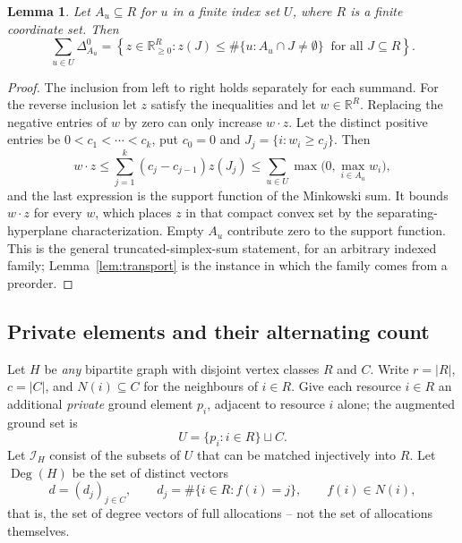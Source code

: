 \documentclass[11pt]{article}
\numberwithin{equation}{section}
\newtheorem{lemma}[theorem]{Lemma}
\theoremstyle{definition}
\theoremstyle{remark}
\newcommand{\R}{\mathbb R}
\newcommand{\Deg}{\operatorname{Deg}}
\newcommand{\Ical}{\mathcal I}
\newcommand{\Dz}[1]{\Delta^{0}_{#1}}
\begin{document}
\begin{lemma}
\label{lem:inequalities}
Let $A_u\subseteq R$ for $u$ in a finite index set $U$, where $R$ is a finite
coordinate set. Then
\begin{equation}
 \sum_{u\in U}\Dz{A_u}
 =\left\{z\in\R_{\ge0}^{R}:
 z(J)\le\#\{u:A_u\cap J\ne\emptyset\}\ \text{ for all }J\subseteq R
 \right\}.
 \label{eq:rank-polytope}
\end{equation}
\end{lemma}

\begin{proof}
The inclusion from left to right holds separately for each summand. For the
reverse inclusion let $z$ satisfy the inequalities and let $w\in\R^R$.
Replacing the negative entries of $w$ by zero can only increase $w\cdot z$.
Let the distinct positive entries be $0<c_1<\cdots<c_k$, put $c_0=0$ and
$J_j=\{i:w_i\ge c_j\}$. Then
\[
 w\cdot z\le\sum_{j=1}^{k}(c_j-c_{j-1})z(J_j)
 \le\sum_{u\in U}\max\bigl(0,\max_{i\in A_u}w_i\bigr),
\]
and the last expression is the support function of the Minkowski sum. It
bounds $w\cdot z$ for every $w$, which places $z$ in that compact convex set
by the separating-hyperplane characterization. Empty $A_u$ contribute zero to
the support function. This is the general truncated-simplex-sum statement, for
an arbitrary indexed family; Lemma~\ref{lem:transport} is the instance in
which the family comes from a preorder.
\end{proof}

\subsection{Private elements and their alternating count}

Let $H$ be \emph{any} bipartite graph with disjoint vertex classes $R$ and
$C$. Write $r=|R|$, $c=|C|$, and $N(i)\subseteq C$ for the neighbours of
$i\in R$. Give each resource $i\in R$ an additional \emph{private} ground
element $p_i$, adjacent to resource $i$ alone; the augmented ground set is
\[
 U=\{p_i:i\in R\}\sqcup C .
\]
Let $\Ical_H$ consist of the subsets of $U$ that can be matched injectively
into $R$. Let $\Deg(H)$ be the set of distinct vectors
\begin{equation}
 d=(d_j)_{j\in C},\qquad
 d_j=\#\{i\in R:f(i)=j\},\qquad f(i)\in N(i),
 \label{eq:degree-vectors}
\end{equation}
that is, the set of degree vectors of full allocations -- not the set of
allocations themselves.
\end{document}
